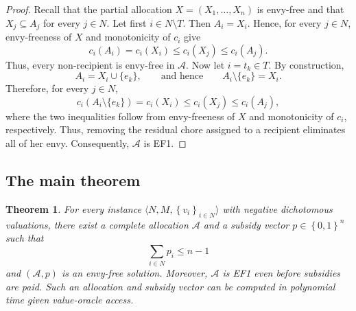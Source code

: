 \documentclass[sigconf,anonymous]{aamas}
\newcommand{\agents}{N}
\newcommand{\items}{M}
\newcommand{\alloc}{\mathcal{A}}
\newcommand{\subsidy}{p}
\newcommand{\set}[1]{\left\{#1\right\}}
\theoremstyle{acmplain}
\newtheorem{theorem}{Theorem}[section]
\theoremstyle{acmdefinition}
\theoremstyle{acmplain}
\begin{document}
\begin{proof}
Recall that the partial allocation $X=(X_1,\ldots,X_n)$ is envy-free and that $X_j\subseteq A_j$ for every $j\in N$. Let first $i\in N\setminus T$. Then $A_i=X_i$. Hence, for every $j\in N$, envy-freeness of $X$ and monotonicity of $c_i$ give
\[
    c_i(A_i)
    =
    c_i(X_i)
    \leq
    c_i(X_j)
    \leq
    c_i(A_j).
\]
Thus, every non-recipient is envy-free in $\mathcal{A}$. Now let $i=t_k\in T$. By construction,
\[ A_i=X_i\cup\{e_k\},
    \qquad\text{and hence}\qquad
    A_i\setminus\{e_k\}=X_i.
\]
Therefore, for every $j\in N$,
\[c_i(A_i\setminus\{e_k\})
    =
    c_i(X_i)
    \leq
    c_i(X_j)
    \leq
    c_i(A_j),
\]
where the two inequalities follow from envy-freeness of $X$ and monotonicity of $c_i$, respectively. Thus, removing the residual chore assigned to a recipient eliminates all of her envy. Consequently, $\mathcal{A}$ is EF1.
\end{proof}%
\subsection{The main theorem}
\label{sec:m-main}




\begin{theorem}
\label{thm:m-main}
For every instance
$\langle \agents,\items,\set{v_i}_{i\in\agents}\rangle$ with negative dichotomous valuations, there exist a complete allocation $\alloc$ and a subsidy vector $\subsidy\in\set{0,1}^n$ such that
\[
    \sum_{i\in\agents}\subsidy_i\leq n-1
\]
and $(\alloc,\subsidy)$ is an envy-free solution. Moreover, $\alloc$ is EF1 even before subsidies are paid. Such an allocation and subsidy vector can be computed in polynomial time given value-oracle access.
\end{theorem}
\end{document}
